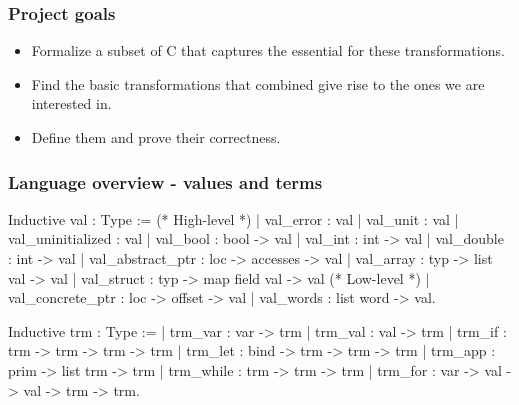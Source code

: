 \begin{frame}[fragile]
\frametitle{Project goals}

\begin{itemize}
	\setlength\itemsep{1.5em}
	\item Formalize a subset of C that captures the essential for these transformations.\\
	\item Find the basic transformations that combined give rise to the ones we are interested in.\\
	\item Define them and prove their correctness.
\end{itemize}

\end{frame}


\begin{frame}[fragile]
\frametitle{Language overview - values and terms}

\begin{coqs}
Inductive val : Type :=
  (* High-level *)
  | val_error : val
  | val_unit : val
  | val_uninitialized : val
  | val_bool : bool -> val
  | val_int : int -> val
  | val_double : int -> val
  | val_abstract_ptr : loc -> accesses -> val
  | val_array : typ -> list val -> val
  | val_struct : typ -> map field val -> val
  (* Low-level *)
  | val_concrete_ptr : loc -> offset -> val
  | val_words : list word -> val.
\end{coqs}

\begin{coqs}
Inductive trm : Type :=
  | trm_var : var -> trm
  | trm_val : val -> trm
  | trm_if : trm -> trm -> trm -> trm
  | trm_let : bind -> trm -> trm -> trm
  | trm_app : prim -> list trm -> trm
  | trm_while : trm -> trm -> trm
  | trm_for : var -> val -> val -> trm -> trm.
\end{coqs}

\end{frame}


